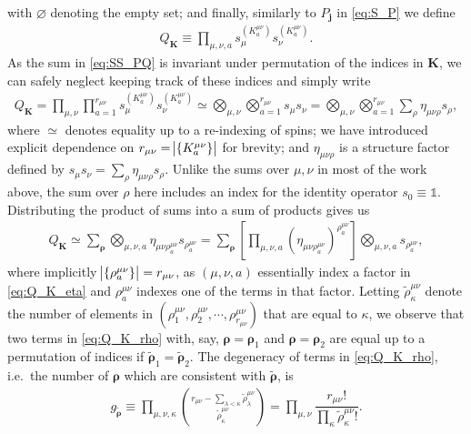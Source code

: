 \documentclass[aps,11pt,notitlepage,nofootinbib,longbibliography]{revtex4-1}
\newcommand{\f}[2]{\dfrac{#1}{#2}} %
\newcommand{\p}[1]{\left(#1\right)} %
\renewcommand{\sp}[1]{\left[#1\right]} %
\renewcommand{\set}[1]{\left\{#1\right\}} %
\renewcommand{\v}{\bm} %
\newcommand{\1}{\mathds{1}}
\begin{document}
with $\varnothing$ denoting the empty set; and finally, similarly to
$P_{\v j}$ in \eqref{eq:S_P} we define
\begin{align}
  Q_{\v K} \equiv \prod_{\mu,\nu,a}
  s_\mu^{(K^{\mu\nu}_a)} s_\nu^{(K^{\mu\nu}_a)}.
\end{align}
As the sum in \eqref{eq:SS_PQ} is invariant under permutation of the
indices in $\v K$, we can safely neglect keeping track of these
indices and simply write
\begin{align}
  Q_{\v K}
  = \prod_{\mu,\nu} \prod_{a=1}^{r_{\mu\nu}}
  s_\mu^{(K^{\mu\nu}_a)} s_\nu^{(K^{\mu\nu}_a)}
  \simeq \bigotimes_{\mu,\nu} \bigotimes_{a=1}^{r_{\mu\nu}} s_\mu s_\nu
  = \bigotimes_{\mu,\nu} \bigotimes_{a=1}^{r_{\mu\nu}}
  \sum_\rho \eta_{\mu\nu\rho} s_\rho,
  \label{eq:Q_K_eta}
\end{align}
where $\simeq$ denotes equality up to a re-indexing of spins; we have
introduced explicit dependence on
$r_{\mu\nu}=\abs{\set{K^{\mu\nu}_a}}$ for brevity; and
$\eta_{\mu\nu\rho}$ is a structure factor defined by
$s_\mu s_\nu=\sum_\rho\eta_{\mu\nu\rho}s_\rho$.  Unlike the sums over
$\mu,\nu$ in most of the work above, the sum over $\rho$ here includes
an index for the identity operator $s_0\equiv\1$.  Distributing the
product of sums into a sum of products gives us
\begin{align}
  Q_{\v K}
  \simeq \sum_{\v\rho} \bigotimes_{\mu,\nu,a}
  \eta_{\mu\nu\rho^{\mu\nu}_a} s_{\rho^{\mu\nu}_a}
  = \sum_{\v\rho} \sp{\prod_{\mu,\nu,a}
    \p{\eta_{\mu\nu\rho^{\mu\nu}_a}}^{\rho^{\mu\nu}_a}}
  \bigotimes_{\mu,\nu,a} s_{\rho^{\mu\nu}_a},
  \label{eq:Q_K_rho}
\end{align}
where implicitly $\abs{\set{\rho^{\mu\nu}_a}}=r_{\mu\nu}$, as
$\p{\mu,\nu,a}$ essentially index a factor in \eqref{eq:Q_K_eta} and
$\rho^{\mu\nu}_a$ indexes one of the terms in that factor.  Letting
$\tilde\rho^{\mu\nu}_\kappa$ denote the number of elements in
$\p{\rho^{\mu\nu}_1,\rho^{\mu\nu}_2,\cdots,\rho^{\mu\nu}_{r_{\mu\nu}}}$
that are equal to $\kappa$, we observe that two terms in
\eqref{eq:Q_K_rho} with, say, $\v\rho=\v\rho_1$ and $\v\rho=\v\rho_2$
are equal up to a permutation of indices if
$\tilde{\v\rho}_1=\tilde{\v\rho}_2$.  The degeneracy of terms in
\eqref{eq:Q_K_rho}, i.e.~the number of $\v\rho$ which are consistent
with $\tilde{\v\rho}$, is
\begin{align}
  g_{\tilde{\v\rho}}
  \equiv \prod_{\mu,\nu,\kappa}
  { r_{\mu\nu} - \sum_{\lambda<\kappa} \tilde\rho^{\mu\nu}_\lambda
    \choose \tilde\rho^{\mu\nu}_\kappa }
  = \prod_{\mu,\nu}
  \f{r_{\mu\nu}!}{\prod_\kappa\tilde\rho^{\mu\nu}_\kappa!}.
\end{align}
\end{document}
